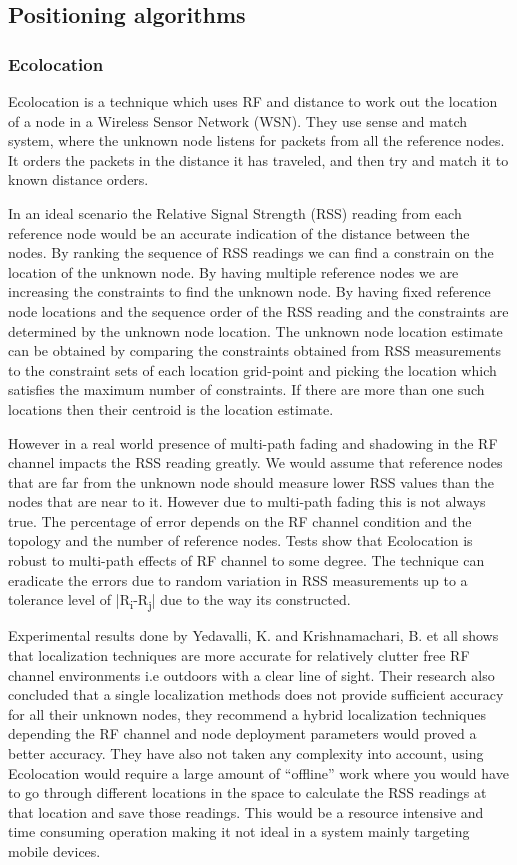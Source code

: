 
\subsection{Positioning algorithms}


\subsubsection{Ecolocation}

Ecolocation\cite{Ecolocation} is a technique which uses RF and distance
to work out the location of a node in a Wireless Sensor Network (WSN).
They use sense and match system, where the unknown node listens for
packets from all the reference nodes. It orders the packets in the
distance it has traveled, and then try and match it to known distance
orders. 

In an ideal scenario the Relative Signal Strength (RSS) reading from
each reference node would be an accurate indication of the distance
between the nodes. By ranking the sequence of RSS readings we can
find a constrain on the location of the unknown node. By having multiple
reference nodes we are increasing the constraints to find the unknown
node. By having fixed reference node locations and the sequence order
of the RSS reading and the constraints are determined by the unknown
node location. The unknown node location estimate can be obtained
by comparing the constraints obtained from RSS measurements to the
constraint sets of each location grid-point and picking the location
which satisfies the maximum number of constraints. If there are more
than one such locations then their centroid is the location estimate.

However in a real world presence of multi-path fading and shadowing
in the RF channel impacts the RSS reading greatly. We would assume
that reference nodes that are far from the unknown node should measure
lower RSS values than the nodes that are near to it. However due to
multi-path fading this is not always true. The percentage of error
depends on the RF channel condition and the topology and the number
of reference nodes. Tests show that Ecolocation is robust to multi-path
effects of RF channel to some degree. The technique can eradicate
the errors due to random variation in RSS measurements up to a tolerance
level of |R\textsubscript{i}-R\textsubscript{j}| due to the way
its constructed.

Experimental results done by Yedavalli, K. and Krishnamachari, B.
et all shows that localization techniques are more accurate for relatively
clutter free RF channel environments i.e outdoors with a clear line
of sight. Their research also concluded that a single localization
methods does not provide sufficient accuracy for all their unknown
nodes, they recommend a hybrid localization techniques depending the
RF channel and node deployment parameters would proved a better accuracy.
They have also not taken any complexity into account, using Ecolocation
would require a large amount of ``offline'' work where you would
have to go through different locations in the space to calculate the
RSS readings at that location and save those readings. This would
be a resource intensive and time consuming operation making it not
ideal in a system mainly targeting mobile devices.


